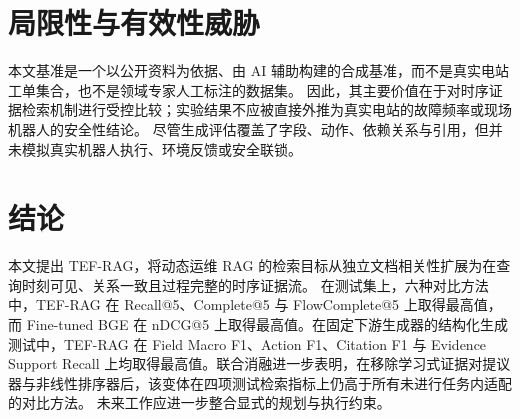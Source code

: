 \begin{table}[t]
\caption{生成测试集上的主要结构化生成指标。}
\label{tab:generation_results}
\centering
\small
\setlength{\tabcolsep}{3pt}
\end{table}

\section{局限性与有效性威胁}
\label{sec:limitations}

本文基准是一个以公开资料为依据、由 AI 辅助构建的合成基准，而不是真实电站工单集合，也不是领域专家人工标注的数据集。
因此，其主要价值在于对时序证据检索机制进行受控比较；实验结果不应被直接外推为真实电站的故障频率或现场机器人的安全性结论。
尽管生成评估覆盖了字段、动作、依赖关系与引用，但并未模拟真实机器人执行、环境反馈或安全联锁。

\section{结论}
\label{sec:conclusion}

本文提出 TEF-RAG，将动态运维 RAG 的检索目标从独立文档相关性扩展为在查询时刻可见、关系一致且过程完整的时序证据流。
在测试集上，六种对比方法中，TEF-RAG 在 Recall@5、Complete@5 与 FlowComplete@5 上取得最高值，而 Fine-tuned BGE 在 nDCG@5 上取得最高值。在固定下游生成器的结构化生成测试中，TEF-RAG 在 Field Macro F1、Action F1、Citation F1 与 Evidence Support Recall 上均取得最高值。联合消融进一步表明，在移除学习式证据对提议器与非线性排序器后，该变体在四项测试检索指标上仍高于所有未进行任务内适配的对比方法。
未来工作应进一步整合显式的规划与执行约束。
